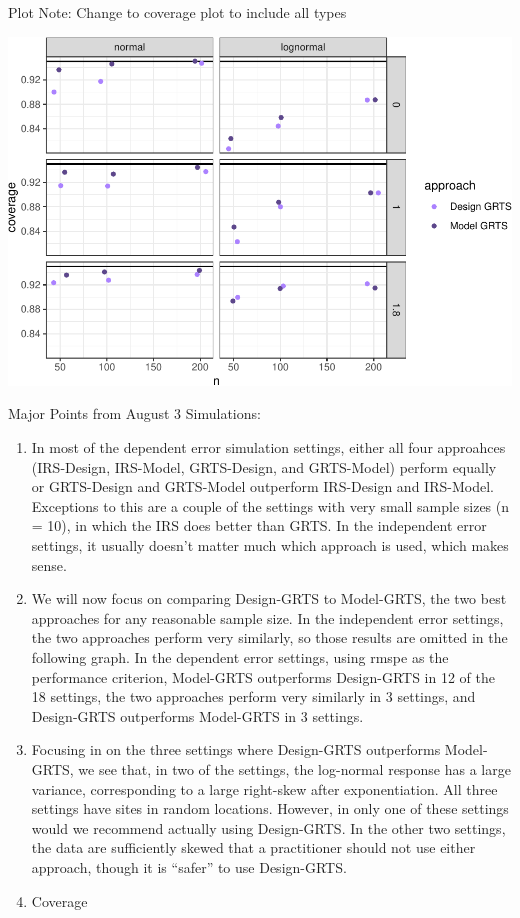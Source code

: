 \documentclass[]{elsarticle} %
\begin{document}
Plot Note: Change to coverage plot to include all types

\includegraphics{SpatialDVM_Manuscript_files/figure-latex/unnamed-chunk-7-1.pdf}

Major Points from August 3 Simulations:

\begin{enumerate}
\def\labelenumi{\arabic{enumi}.}
\item
  In most of the dependent error simulation settings, either all four
  approahces (IRS-Design, IRS-Model, GRTS-Design, and GRTS-Model)
  perform equally or GRTS-Design and GRTS-Model outperform IRS-Design
  and IRS-Model. Exceptions to this are a couple of the settings with
  very small sample sizes (n = 10), in which the IRS does better than
  GRTS. In the independent error settings, it usually doesn't matter
  much which approach is used, which makes sense.
\item
  We will now focus on comparing Design-GRTS to Model-GRTS, the two best
  approaches for any reasonable sample size. In the independent error
  settings, the two approaches perform very similarly, so those results
  are omitted in the following graph. In the dependent error settings,
  using rmspe as the performance criterion, Model-GRTS outperforms
  Design-GRTS in 12 of the 18 settings, the two approaches perform very
  similarly in 3 settings, and Design-GRTS outperforms Model-GRTS in 3
  settings.
\item
  Focusing in on the three settings where Design-GRTS outperforms
  Model-GRTS, we see that, in two of the settings, the log-normal
  response has a large variance, corresponding to a large right-skew
  after exponentiation. All three settings have sites in random
  locations. However, in only one of these settings would we recommend
  actually using Design-GRTS. In the other two settings, the data are
  sufficiently skewed that a practitioner should not use either
  approach, though it is ``safer'' to use Design-GRTS.
\item
  Coverage
\end{enumerate}
\end{document}

